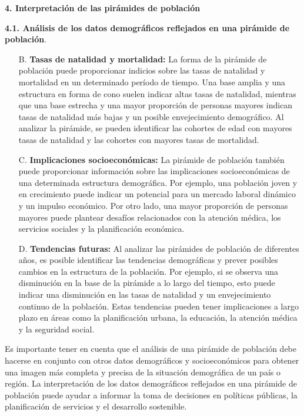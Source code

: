 \documentclass[8pt,a4paper]{beamer}
\begin{document}
{\begin{frame}{\textbf{4. Interpretación de las pirámides de población}}
\begin{block}{\textbf{4.1. Análisis de los datos demográficos reflejados en una pirámide de población}.}
\begin{enumerate}
\item[B.] \textbf{Tasas de natalidad y mortalidad:} La forma de la pirámide de población puede proporcionar indicios sobre las tasas de natalidad y mortalidad en un determinado período de tiempo. Una base amplia y una estructura en forma de cono suelen indicar altas tasas de natalidad, mientras que una base estrecha y una mayor proporción de personas mayores indican tasas de natalidad más bajas y un posible envejecimiento demográfico. Al analizar la pirámide, se pueden identificar las cohortes de edad con mayores tasas de natalidad y las cohortes con mayores tasas de mortalidad.
\end{enumerate}
\end{block}
\end{frame}

\begin{frame}{}

\begin{block}{}
\justifying
\begin{enumerate}
\justifying
\item[C.] \textbf{Implicaciones socioeconómicas:} La pirámide de población también puede proporcionar información sobre las implicaciones socioeconómicas de una determinada estructura demográfica. Por ejemplo, una población joven y en crecimiento puede indicar un potencial para un mercado laboral dinámico y un impulso económico. Por otro lado, una mayor proporción de personas mayores puede plantear desafíos relacionados con la atención médica, los servicios sociales y la planificación económica.

\item[D.] \textbf{Tendencias futuras:} Al analizar las pirámides de población de diferentes años, es posible identificar las tendencias demográficas y prever posibles cambios en la estructura de la población. Por ejemplo, si se observa una disminución en la base de la pirámide a lo largo del tiempo, esto puede indicar una disminución en las tasas de natalidad y un envejecimiento continuo de la población. Estas tendencias pueden tener implicaciones a largo plazo en áreas como la planificación urbana, la educación, la atención médica y la seguridad social.
\end{enumerate}
Es importante tener en cuenta que el análisis de una pirámide de población debe hacerse en conjunto con otros datos demográficos y socioeconómicos para obtener una imagen más completa y precisa de la situación demográfica de un país o región. La interpretación de los datos demográficos reflejados en una pirámide de población puede ayudar a informar la toma de decisiones en políticas públicas, la planificación de servicios y el desarrollo sostenible.
\end{block}
\end{frame}

}
\end{document}

